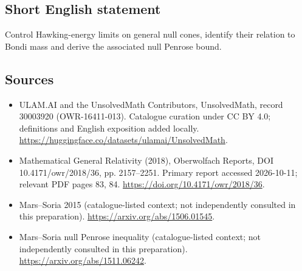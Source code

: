 \documentclass[11pt]{article}
\begin{document}
\subsection{Short English statement}
Control Hawking-energy limits on general null cones, identify their relation to Bondi mass and derive the associated null Penrose bound.
\subsection{Sources}
\begin{itemize}
\item[\hypertarget{source:30003920:1}{S1}] ULAM.AI and the UnsolvedMath Contributors, UnsolvedMath, record 30003920 (OWR-16411-013). Catalogue curation under CC BY 4.0; definitions and English exposition added locally.
\url{https://huggingface.co/datasets/ulamai/UnsolvedMath}.
\item[\hypertarget{source:30003920:2}{S2}] Mathematical General Relativity (2018), Oberwolfach Reports, DOI 10.4171/owr/2018/36, pp. 2157--2251. Primary report accessed 2026-10-11; relevant PDF pages 83, 84.
\url{https://doi.org/10.4171/owr/2018/36}.
\item[\hypertarget{source:30003920:3}{S3}] Mars--Soria 2015 (catalogue-listed context; not independently consulted in this preparation).
\url{https://arxiv.org/abs/1506.01545}.
\item[\hypertarget{source:30003920:4}{S4}] Mars--Soria null Penrose inequality (catalogue-listed context; not independently consulted in this preparation).
\url{https://arxiv.org/abs/1511.06242}.
\end{itemize}
\label{end:30003920}
\end{document}
